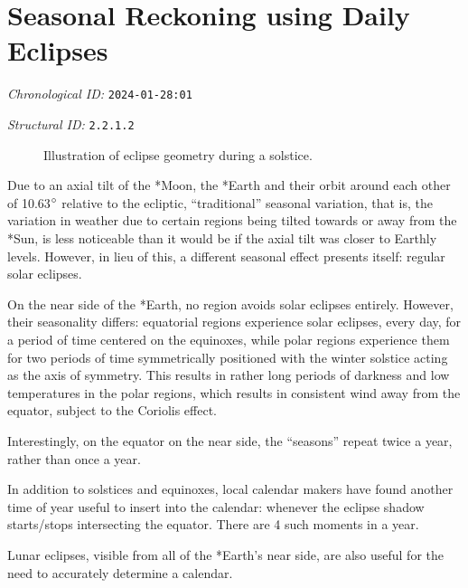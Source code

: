 \section{Seasonal Reckoning using Daily Eclipses}
\emph{Chronological ID:} \texttt{2024-01-28:01}

\emph{Structural ID:} \texttt{2.2.1.2}

\begin{figure}[h]
  \caption{Illustration of eclipse geometry during a solstice.}
\end{figure}

Due to an axial tilt of the *Moon, the *Earth and their orbit around each other of 10.63$\degree$ relative to the ecliptic, ``traditional'' seasonal variation, that is, the variation in weather due to certain regions being tilted towards or away from the *Sun, is less noticeable than it would be if the axial tilt was closer to Earthly levels. However, in lieu of this, a different seasonal effect presents itself: regular solar eclipses.

On the near side of the *Earth, no region avoids solar eclipses entirely. However, their seasonality differs: equatorial regions experience solar eclipses, every day, for a period of time centered on the equinoxes, while polar regions experience them for two periods of time symmetrically positioned with the winter solstice acting as the axis of symmetry. This results in rather long periods of darkness and low temperatures in the polar regions, which results in consistent wind away from the equator, subject to the Coriolis effect.

Interestingly, on the equator on the near side, the ``seasons'' repeat twice a year, rather than once a year.

In addition to solstices and equinoxes, local calendar makers have found another time of year useful to insert into the calendar: whenever the eclipse shadow starts/stops intersecting the equator. There are 4 such moments in a year.

Lunar eclipses, visible from all of the *Earth's near side, are also useful for the need to accurately determine a calendar.
\newpage

